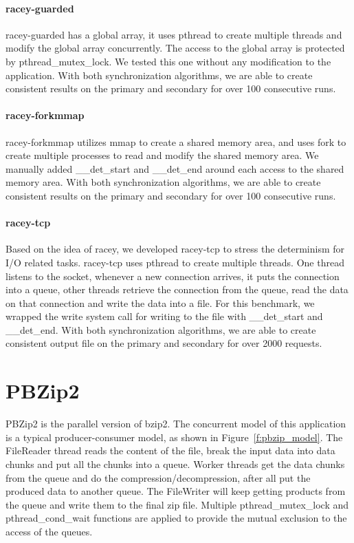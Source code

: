 \paragraph{racey-guarded} racey-guarded has a global array, it uses pthread to create multiple threads and modify the global array concurrently. The access to the global array is protected by pthread\_mutex\_lock. We tested this one without any modification to the application. With both synchronization algorithms, we are able to create consistent results on the primary and secondary for over 100 consecutive runs.

\paragraph{racey-forkmmap} racey-forkmmap utilizes mmap to create a shared memory area, and uses fork to create multiple processes to read and modify the shared memory area. We manually added \_\_det\_start and \_\_det\_end around each access to the shared memory area. With both synchronization algorithms, we are able to create consistent results on the primary and secondary for over 100 consecutive runs.

\paragraph{racey-tcp} Based on the idea of racey, we developed racey-tcp to stress the determinism for I/O related tasks. racey-tcp uses pthread to create multiple threads. One thread listens to the socket, whenever a new connection arrives, it puts the connection into a queue, other threads retrieve the connection from the queue, read the data on that connection and write the data into a file. For this benchmark, we wrapped the write system call for writing to the file with \_\_det\_start and \_\_det\_end. With both synchronization algorithms, we are able to create consistent output file on the primary and secondary for over 2000 requests.

\section{PBZip2}
PBZip2 is the parallel version of bzip2. The concurrent model of this application is a typical producer-consumer model, as shown in Figure~\ref{f:pbzip_model}. The FileReader thread reads the content of the file, break the input data into data chunks and put all the chunks into a queue. Worker threads get the data chunks from the queue and do the compression/decompression, after all put the produced data to another queue. The FileWriter will keep getting products from the queue and write them to the final zip file. Multiple pthread\_mutex\_lock and pthread\_cond\_wait functions are applied to provide the mutual exclusion to the access of the queues.


